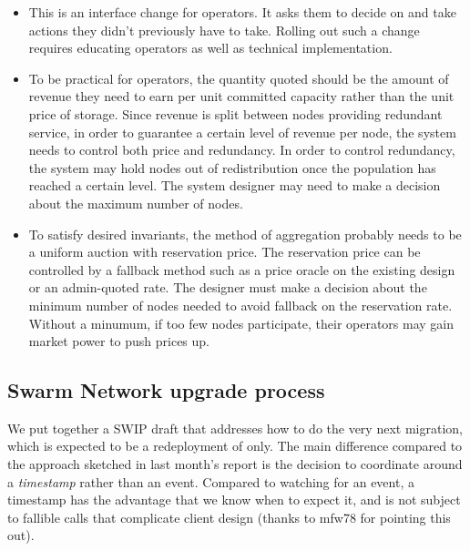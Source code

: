 \begin{itemize}
  \item This is an interface change for operators. It asks them to decide on and take actions they didn't previously have to take. Rolling out such a change requires educating operators as well as technical implementation.
  \item To be practical for operators, the quantity quoted should be the amount of revenue they need to earn per unit committed capacity rather than the unit price of storage. Since revenue is split between nodes providing redundant service, in order to guarantee a certain level of revenue per node, the system needs to control both price and redundancy. In order to control redundancy, the system may hold nodes out of redistribution once the population has reached a certain level. The system designer may need to make a decision about the maximum number of nodes.
  \item To satisfy desired invariants, the method of aggregation probably needs to be a uniform auction with reservation price. The reservation price can be controlled by a fallback method such as a price oracle on the existing design or an admin-quoted rate. The designer must make a decision about the minimum number of nodes needed to avoid fallback on the reservation rate. Without a minumum, if too few nodes participate, their operators may gain market power to push prices up.
\end{itemize}

\subsection*{Swarm Network upgrade process}

We put together a SWIP draft that addresses how to do the very next migration, which is expected to be a redeployment of  only. 
%
The main difference compared to the approach sketched in last month's report is the decision to coordinate around a \emph{timestamp} rather than an event.
%
Compared to watching for an event, a timestamp has the advantage that we know when to expect it, and is not subject to fallible  calls that complicate client design (thanks to mfw78 for pointing this out).

